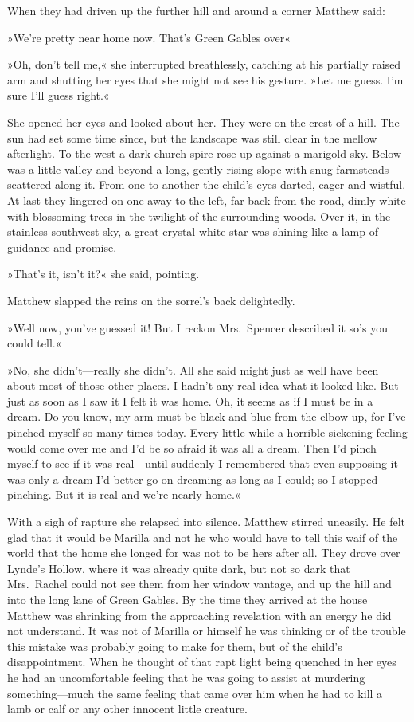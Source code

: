 When they had driven up the further hill and around a corner Matthew said:

»We're pretty near home now. That's Green Gables over\longdash«

»Oh, don't tell me,« she interrupted breathlessly, catching at his partially raised arm and shutting her eyes that she might not see his gesture. »Let me guess. I'm sure I'll guess right.«

She opened her eyes and looked about her. They were on the crest of a hill. The sun had set some time since, but the landscape was still clear in the mellow afterlight. To the west a dark church spire rose up against a marigold sky. Below was a little valley and beyond a long, gently-rising slope with snug farmsteads scattered along it. From one to another the child's eyes darted, eager and wistful. At last they lingered on one away to the left, far back from the road, dimly white with blossoming trees in the twilight of the surrounding woods. Over it, in the stainless southwest sky, a great crystal-white star was shining like a lamp of guidance and promise.

»That's it, isn't it?« she said, pointing.

Matthew slapped the reins on the sorrel's back delightedly.

»Well now, you've guessed it! But I reckon Mrs.~Spencer described it so's you could tell.«

»No, she didn't—really she didn't. All she said might just as well have been about most of those other places. I hadn't any real idea what it looked like. But just as soon as I saw it I felt it was home. Oh, it seems as if I must be in a dream. Do you know, my arm must be black and blue from the elbow up, for I've pinched myself so many times today. Every little while a horrible sickening feeling would come over me and I'd be so afraid it was all a dream. Then I'd pinch myself to see if it was real—until suddenly I remembered that even supposing it was only a dream I'd better go on dreaming as long as I could; so I stopped pinching. But it is real and we're nearly home.«

With a sigh of rapture she relapsed into silence. Matthew stirred uneasily. He felt glad that it would be Marilla and not he who would have to tell this waif of the world that the home she longed for was not to be hers after all. They drove over Lynde's Hollow, where it was already quite dark, but not so dark that Mrs.~Rachel could not see them from her window vantage, and up the hill and into the long lane of Green Gables. By the time they arrived at the house Matthew was shrinking from the approaching revelation with an energy he did not understand. It was not of Marilla or himself he was thinking or of the trouble this mistake was probably going to make for them, but of the child's disappointment. When he thought of that rapt light being quenched in her eyes he had an uncomfortable feeling that he was going to assist at murdering something—much the same feeling that came over him when he had to kill a lamb or calf or any other innocent little creature.

